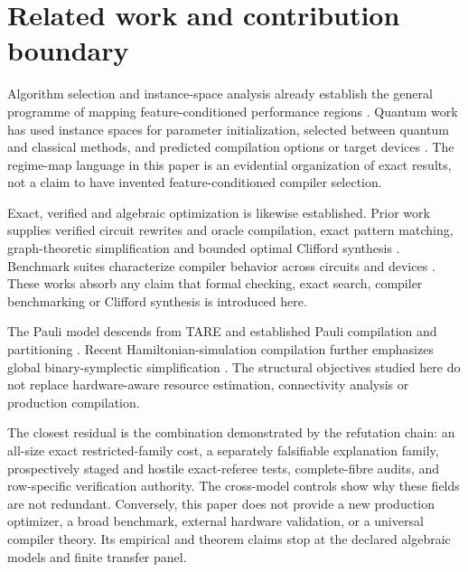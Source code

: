 \section{Related work and contribution boundary}

Algorithm selection and instance-space analysis already establish the general programme of mapping feature-conditioned performance regions \cite{rice1976algorithm,smithmiles2009meta,smithmiles2023isa}.  Quantum work has used instance spaces for parameter initialization, selected between quantum and classical methods, and predicted compilation options or target devices \cite{katial2025qaoa,moussa2020selection,quetschlich2023options,quetschlich2025predictor}.  The regime-map language in this paper is an evidential organization of exact results, not a claim to have invented feature-conditioned compiler selection.

Exact, verified and algebraic optimization is likewise established.  Prior work supplies verified circuit rewrites and oracle compilation, exact pattern matching, graph-theoretic simplification and bounded optimal Clifford synthesis \cite{hietala2021verified,li2022oracles,iten2022patterns,duncan2020zx,bravyi2022clifford}.  Benchmark suites characterize compiler behavior across circuits and devices \cite{li2023qasmbench,quetschlich2023mqtbench}.  These works absorb any claim that formal checking, exact search, compiler benchmarking or Clifford synthesis is introduced here.

The Pauli model descends from TARE and established Pauli compilation and partitioning \cite{schillo2026tare,izmaylov2020unitary,peres2023pbc,vandenberg2020diagonalization,paykin2023pcoast}.  Recent Hamiltonian-simulation compilation further emphasizes global binary-symplectic simplification \cite{yang2026symphony}.  The structural objectives studied here do not replace hardware-aware resource estimation, connectivity analysis or production compilation.

The closest residual is the combination demonstrated by the refutation chain: an all-size exact restricted-family cost, a separately falsifiable explanation family, prospectively staged and hostile exact-referee tests, complete-fibre audits, and row-specific verification authority.  The cross-model controls show why these fields are not redundant.  Conversely, this paper does not provide a new production optimizer, a broad benchmark, external hardware validation, or a universal compiler theory.  Its empirical and theorem claims stop at the declared algebraic models and finite transfer panel.
